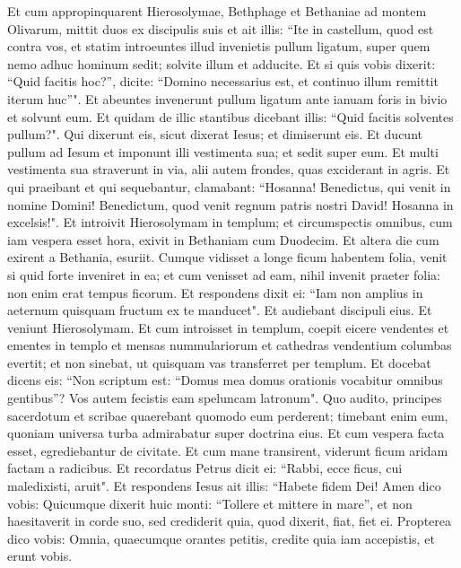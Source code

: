 \begin{biblechapter}  
\verse Et cum appropinquarent Hierosolymae, Bethphage et Bethaniae ad montem Olivarum, mittit duos ex discipulis suis 
\verse et ait illis: “Ite in castellum, quod est contra vos, et statim introeuntes illud invenietis pullum ligatum, super quem nemo adhuc hominum sedit; solvite illum et adducite. 
\verse Et si quis vobis dixerit: “Quid facitis hoc?”, dicite: “Domino necessarius est, et continuo illum remittit iterum huc”". 
\verse Et abeuntes invenerunt pullum ligatum ante ianuam foris in bivio et solvunt eum. 
\verse Et quidam de illic stantibus dicebant illis: “Quid facitis solventes pullum?". 
\verse Qui dixerunt eis, sicut dixerat Iesus; et dimiserunt eis. 
\verse Et ducunt pullum ad Iesum et imponunt illi vestimenta sua; et sedit super eum. 
\verse Et multi vestimenta sua straverunt in via, alii autem frondes, quas exciderant in agris. 
\verse Et qui praeibant et qui sequebantur, clamabant: “Hosanna! Benedictus, qui venit in nomine Domini! 
\verse Benedictum, quod venit regnum patris nostri David! Hosanna in excelsis!". 
\verse Et introivit Hierosolymam in templum; et circumspectis omnibus, cum iam vespera esset hora, exivit in Bethaniam cum Duodecim. 
\verse Et altera die cum exirent a Bethania, esuriit. 
\verse Cumque vidisset a longe ficum habentem folia, venit si quid forte inveniret in ea; et cum venisset ad eam, nihil invenit praeter folia: non enim erat tempus ficorum. 
\verse Et respondens dixit ei: “Iam non amplius in aeternum quisquam fructum ex te manducet". Et audiebant discipuli eius. 
\verse Et veniunt Hierosolymam. Et cum introisset in templum, coepit eicere vendentes et ementes in templo et mensas nummulariorum et cathedras vendentium columbas evertit; 
\verse et non sinebat, ut quisquam vas transferret per templum. 
\verse Et docebat dicens eis: “Non scriptum est: “Domus mea domus orationis vocabitur omnibus gentibus”? Vos autem fecistis eam speluncam latronum". 
\verse Quo audito, principes sacerdotum et scribae quaerebant quomodo eum perderent; timebant enim eum, quoniam universa turba admirabatur super doctrina eius.  
\verse Et cum vespera facta esset, egrediebantur de civitate. 
\verse Et cum mane transirent, viderunt ficum aridam factam a radicibus. 
\verse Et recordatus Petrus dicit ei: “Rabbi, ecce ficus, cui maledixisti, aruit". 
\verse Et respondens Iesus ait illis: “Habete fidem Dei! 
\verse Amen dico vobis: Quicumque dixerit huic monti: “Tollere et mittere in mare”, et non haesitaverit in corde suo, sed crediderit quia, quod dixerit, fiat, fiet ei.  
\verse Propterea dico vobis: Omnia, quaecumque orantes petitis, credite quia iam accepistis, et erunt vobis. 

\end{biblechapter}
